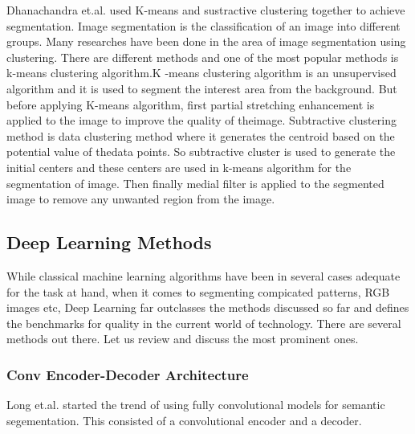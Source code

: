 \documentclass[19pt]{article}
\begin{document}
Dhanachandra et.al. \cite{dhanachandra2015image} used K-means and sustractive clustering together to achieve segmentation. Image segmentation is the classification of an image into different groups. Many researches have been done in the area of image segmentation using clustering. There are different methods and one of the most popular methods is k-means clustering algorithm.K -means clustering algorithm is an unsupervised algorithm and it is used to segment the interest area from the background. But before applying K-means algorithm, first partial stretching enhancement is applied to the image to improve the quality of theimage. Subtractive clustering method is data clustering method where it generates the centroid based on the potential value of thedata points. So subtractive cluster is used to generate the initial centers and these centers are used in k-means algorithm for the segmentation of image. Then finally medial filter is applied to the segmented image to remove any unwanted region from the image. 
\newpage
\subsection{Deep Learning Methods}
While classical machine learning algorithms have been in several cases adequate for the task at hand, when it comes to segmenting compicated patterns, RGB images etc, Deep Learning far outclasses the methods discussed so far and defines the benchmarks for quality in the current world of technology. There are several methods out there. Let us review and discuss the most prominent ones.

\subsubsection{Conv Encoder-Decoder Architecture}
Long et.al. \cite{long2015fully} started the trend of using fully convolutional models for semantic segementation. This consisted of a convolutional encoder and a decoder.
\end{document}
